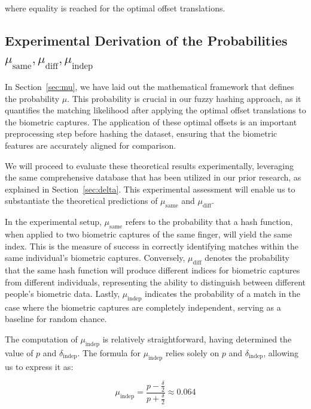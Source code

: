 where equality is reached for the optimal offset translations.

\subsection{Experimental Derivation of the Probabilities \(\mu_{\text{same}}, \mu_{\text{diff}}, \mu_{\text{indep}}\)}

In Section~\ref{sec:mu}, we have laid out the mathematical framework that defines the probability \(\mu\). This probability is crucial in our fuzzy hashing approach, as it quantifies the matching likelihood after applying the optimal offset translations to the biometric captures. The application of these optimal offsets is an important preprocessing step before hashing the dataset, ensuring that the biometric features are accurately aligned for comparison.

We will proceed to evaluate these theoretical results experimentally, leveraging the same comprehensive database that has been utilized in our prior research, as explained in Section~\ref{sec:delta}. This experimental assessment will enable us to substantiate the theoretical predictions of \(\mu_{\text{same}}\) and \(\mu_{\text{diff}}\).

In the experimental setup, \(\mu_{\text{same}}\) refers to the probability that a hash function, when applied to two biometric captures of the same finger, will yield the same index. This is the measure of success in correctly identifying matches within the same individual's biometric captures. Conversely, \(\mu_{\text{diff}}\) denotes the probability that the same hash function will produce different indices for biometric captures from different individuals, representing the ability to distinguish between different people's biometric data. Lastly, \(\mu_{\text{indep}}\) indicates the probability of a match in the case where the biometric captures are completely independent, serving as a baseline for random chance.

The computation of \( \mu_{\text{indep}} \) is relatively straightforward, having determined the value of \( p \) and \(\delta_{\text{indep}}\). The formula for \( \mu_{\text{indep}} \) relies solely on \( p \) and \(\delta_{\text{indep}}\), allowing us to express it as:

\[
    \mu_{\text{indep}} = \frac{p - \frac{\delta}{2}}{p + \frac{\delta}{2}} \approx 0.064
\]

